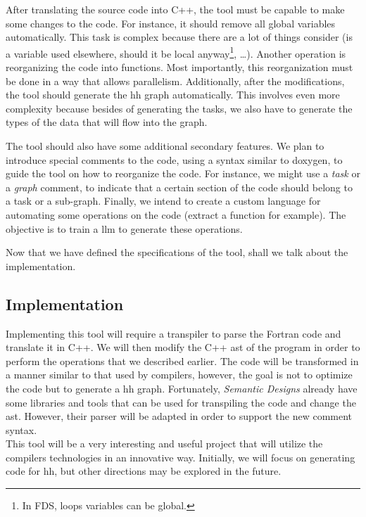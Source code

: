 After translating the source code into C++, the tool must be capable to make
some changes to the code. For instance, it should remove all global variables
automatically. This task is complex because there are a lot of things consider
(is a variable used elsewhere, should it be local anyway\footnote{In FDS, loops
variables can be global.}, \dots). Another operation is reorganizing the code
into functions. Most importantly, this reorganization must be done in a way that
allows parallelism. Additionally, after the modifications, the tool should
generate the \gls{hh} graph automatically. This involves even more complexity
because besides of generating the tasks, we also have to generate the types of
the data that will flow into the graph.

The tool should also have some additional secondary features. We plan to
introduce special comments to the code, using a syntax similar to doxygen, to
guide the tool on how to reorganize the code. For instance, we might use a
\textit{task} or a \textit{graph} comment, to indicate that a certain section of
the code should belong to a task or a sub-graph. Finally, we intend to create a
custom language for automating some operations on the code (extract a function
for example). The objective is to train a \gls{llm} to generate these
operations.

Now that we have defined the specifications of the tool, shall we talk about the
implementation.

\subsection{Implementation}

Implementing this tool will require a transpiler to parse the Fortran code and
translate it in C++. We will then modify the C++ \gls{ast} of the program in
order to perform the operations that we described earlier. The code will be
transformed in a manner similar to that used by compilers, however, the goal is
not to optimize the code but to generate a \gls{hh} graph. Fortunately,
\textit{Semantic Designs} already have some libraries and tools that can be used
for transpiling the code and change the \gls{ast}. However, their \gls{parser}
will be adapted in order to support the new comment syntax.\\

This tool will be a very interesting and useful project that will utilize the
compilers technologies in an innovative way. Initially, we will focus on
generating code for \gls{hh}, but other directions may be explored in the
future.
